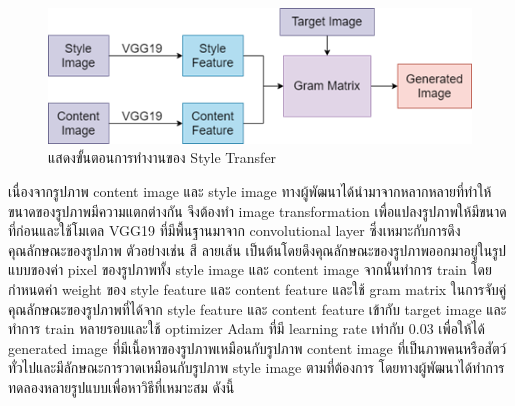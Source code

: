 \documentclass[12pt,oneside,openright,a4paper]{cpe-thai-project}
\begin{document}
\begin{figure}[!h]
  \centering
  \includegraphics[width=15cm]{./image/styleTransfer.png}
  \caption{แสดงขั้นตอนการทำงานของ Style Transfer}
  \label{fig:styleTransfer}
\end{figure}

\par\setlength{\parindent}{5ex}
เนื่องจากรูปภาพ content image และ style image ทางผู้พัฒนาได้นำมาจากหลากหลายที่ทำให้ขนาดของรูปภาพมีความแตกต่างกัน จึงต้องทำ image transformation เพื่อแปลงรูปภาพให้มีขนาดที่ก่อนและใช้โมเดล VGG19 ที่มีพื้นฐานมาจาก convolutional layer ซึ่งเหมาะกับการดึงคุณลักษณะของรูปภาพ ตัวอย่างเช่น สี ลายเส้น เป็นต้นโดยดึงคุณลักษณะของรูปภาพออกมาอยู่ในรูปแบบของค่า pixel ของรูปภาพทั้ง style image และ content image จากนั้นทำการ train โดยกำหนดค่า weight ของ style feature และ content feature และใช้ gram matrix ในการจับคู่คุณลักษณะของรูปภาพที่ได้จาก style feature และ content feature เข้ากับ target image และทำการ train หลายรอบและใช้ optimizer Adam ที่มี learning rate เท่ากับ 0.03 เพื่อให้ได้ generated image ที่มีเนื้อหาของรูปภาพเหมือนกับรูปภาพ content image ที่เป็นภาพคนหรือสัตว์ทั่วไปและมีลักษณะการวาดเหมือนกับรูปภาพ style image ตามที่ต้องการ โดยทางผู้พัฒนาได้ทำการทดลองหลายรูปแบบเพื่อหาวิธีที่เหมาะสม ดังนี้
\end{document}
